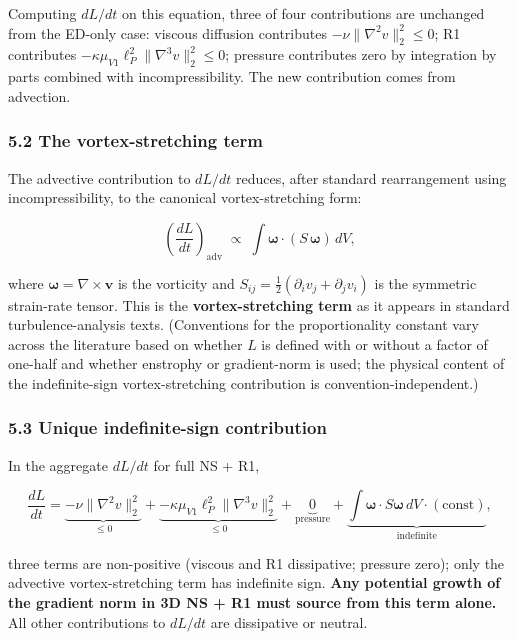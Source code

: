 \documentclass[
  11pt,a4paper]{article}
\begin{document}
Computing \(dL/dt\) on this equation, three of four contributions are
unchanged from the ED-only case: viscous diffusion contributes
\(-\nu \|\nabla^2 v\|_2^2 \le 0\); R1 contributes
\(-\kappa\mu_{V1}\ell_P^2 \|\nabla^3 v\|_2^2 \le 0\); pressure
contributes zero by integration by parts combined with
incompressibility. The new contribution comes from advection.

\subsubsection{5.2 The vortex-stretching
term}\label{the-vortex-stretching-term}

The advective contribution to \(dL/dt\) reduces, after standard
rearrangement using incompressibility, to the canonical
vortex-stretching form:

\[\left(\frac{dL}{dt}\right)_\mathrm{adv} \;\propto\; \int \boldsymbol{\omega} \cdot (S\, \boldsymbol{\omega}) \, dV,\]

where \(\boldsymbol{\omega} = \nabla \times \mathbf{v}\) is the
vorticity and \(S_{ij} = \frac{1}{2}(\partial_i v_j + \partial_j v_i)\)
is the symmetric strain-rate tensor. This is the
\textbf{vortex-stretching term} as it appears in standard
turbulence-analysis texts. (Conventions for the proportionality constant
vary across the literature based on whether \(L\) is defined with or
without a factor of one-half and whether enstrophy or gradient-norm is
used; the physical content of the indefinite-sign vortex-stretching
contribution is convention-independent.)

\subsubsection{5.3 Unique indefinite-sign
contribution}\label{unique-indefinite-sign-contribution}

In the aggregate \(dL/dt\) for full NS + R1,

\[\frac{dL}{dt} = \underbrace{-\nu\|\nabla^2 v\|_2^2}_{\le 0} + \underbrace{-\kappa\mu_{V1}\ell_P^2 \|\nabla^3 v\|_2^2}_{\le 0} + \underbrace{0}_\text{pressure} + \underbrace{\int \boldsymbol{\omega} \cdot S\boldsymbol{\omega} \, dV \cdot (\mathrm{const})}_\text{indefinite},\]

three terms are non-positive (viscous and R1 dissipative; pressure
zero); only the advective vortex-stretching term has indefinite sign.
\textbf{Any potential growth of the gradient norm in 3D NS + R1 must
source from this term alone.} All other contributions to \(dL/dt\) are
dissipative or neutral.
\end{document}
